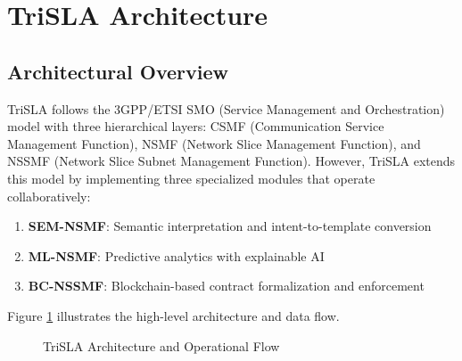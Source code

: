 \documentclass[review]{elsarticle}
\begin{document}
\section{TriSLA Architecture}

\subsection{Architectural Overview}

TriSLA follows the 3GPP/ETSI SMO (Service Management and Orchestration) model with three hierarchical layers: CSMF (Communication Service Management Function), NSMF (Network Slice Management Function), and NSSMF (Network Slice Subnet Management Function). However, TriSLA extends this model by implementing three specialized modules that operate collaboratively:

\begin{enumerate}
    \item \textbf{SEM-NSMF}: Semantic interpretation and intent-to-template conversion
    \item \textbf{ML-NSMF}: Predictive analytics with explainable AI
    \item \textbf{BC-NSSMF}: Blockchain-based contract formalization and enforcement
\end{enumerate}

Figure \ref{fig:architecture} illustrates the high-level architecture and data flow.

\begin{figure}[h]
\centering
{}
\caption{TriSLA Architecture and Operational Flow}
\label{fig:architecture}
\end{figure}
\end{document}
